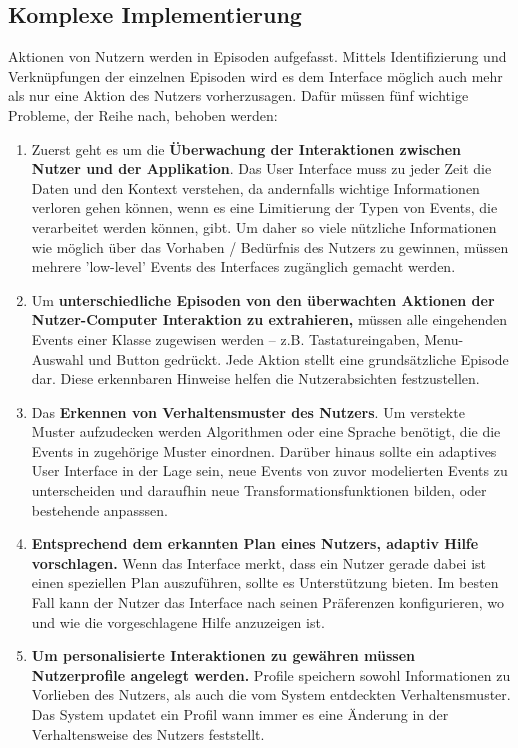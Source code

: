 \subsection{Komplexe Implementierung}
Aktionen von Nutzern werden in Episoden aufgefasst. Mittels Identifizierung und Verknüpfungen der einzelnen 
Episoden wird es dem Interface möglich auch mehr als nur eine Aktion des Nutzers vorherzusagen. 
Dafür müssen fünf wichtige Probleme, der Reihe nach, behoben werden: 
\begin{enumerate}
    \item Zuerst geht es um die \textbf{Überwachung der Interaktionen zwischen Nutzer und der Applikation}. Das User Interface 
    muss zu jeder Zeit die Daten und den Kontext verstehen, da andernfalls wichtige Informationen verloren gehen können, wenn 
    es eine Limitierung der Typen von Events, die verarbeitet werden können, gibt. Um daher so viele nützliche Informationen wie möglich 
    über das Vorhaben / Bedürfnis des Nutzers zu gewinnen, müssen mehrere 'low-level' Events des Interfaces zugänglich gemacht werden.
    \item Um \textbf{unterschiedliche Episoden von den überwachten Aktionen der Nutzer-Computer Interaktion zu extrahieren,} 
    müssen alle eingehenden Events einer Klasse zugewisen werden -- z.B. Tastatureingaben, Menu-Auswahl und Button gedrückt. Jede Aktion 
    stellt eine grundsätzliche Episode dar. Diese erkennbaren Hinweise helfen die Nutzerabsichten festzustellen.
    \item Das \textbf{Erkennen von Verhaltensmuster des Nutzers}. Um verstekte Muster aufzudecken werden Algorithmen oder eine Sprache 
    benötigt, die die Events in zugehörige Muster einordnen. Darüber hinaus sollte ein adaptives User Interface in der Lage sein, 
    neue Events von zuvor modelierten Events zu unterscheiden und daraufhin neue Transformationsfunktionen bilden, oder bestehende anpasssen.
    \item \textbf{Entsprechend dem erkannten Plan eines Nutzers, adaptiv Hilfe vorschlagen.} Wenn das Interface merkt, dass ein Nutzer 
    gerade dabei ist einen speziellen Plan auszuführen, sollte es Unterstützung bieten. Im besten Fall kann der Nutzer das Interface 
    nach seinen Präferenzen konfigurieren, wo und wie die vorgeschlagene Hilfe anzuzeigen ist.
    \item \textbf{Um personalisierte Interaktionen zu gewähren müssen Nutzerprofile angelegt werden.} Profile speichern sowohl Informationen 
    zu Vorlieben des Nutzers, als auch die vom System entdeckten Verhaltensmuster. Das System updatet ein Profil wann immer es 
    eine Änderung in der Verhaltensweise des Nutzers feststellt.
\end{enumerate}

